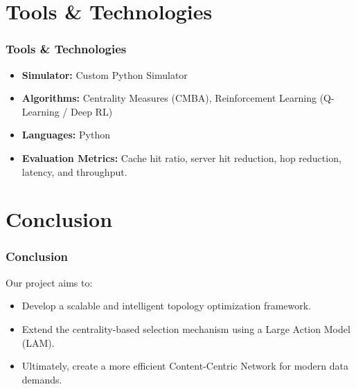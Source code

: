\documentclass{beamer}
\begin{document}
\section{Tools \& Technologies}
\begin{frame}
  \frametitle{Tools \& Technologies}
    \begin{itemize}
        \item \textbf{Simulator:} Custom Python Simulator
        \item \textbf{Algorithms:} Centrality Measures (CMBA), Reinforcement Learning (Q-Learning / Deep RL)
        \item \textbf{Languages:} Python
        \item \textbf{Evaluation Metrics:} Cache hit ratio, server hit reduction, hop reduction, latency, and throughput.
    \end{itemize}
\end{frame}

\section{Conclusion}
\begin{frame}
  \frametitle{Conclusion}
  Our project aims to:
  \begin{itemize}
    \item Develop a scalable and intelligent topology optimization framework.
    \item Extend the centrality-based selection mechanism using a Large Action Model (LAM).
    \item Ultimately, create a more efficient Content-Centric Network for modern data demands.
  \end{itemize}
\end{frame}

\end{document}
